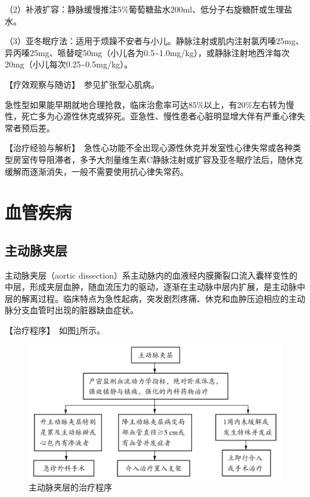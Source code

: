 （2）补液扩容：静脉缓慢推注5\%葡萄糖盐水200ml、低分子右旋糖酐或生理盐水。

（3）亚冬眠疗法：适用于烦躁不安者与小儿。静脉注射或肌内注射氯丙嗪25mg、异丙嗪25mg、哌替啶50mg（小儿各为0.5\textasciitilde{}1.0mg/kg），或静脉注射地西泮每次20mg（小儿每次0.25\textasciitilde{}0.5mg/kg）。

【疗效观察与随访】　参见扩张型心肌病。

急性型如果能早期就地合理抢救，临床治愈率可达85\%以上，有20\%左右转为慢性，死亡多为心源性休克或猝死。亚急性、慢性患者心脏明显增大伴有严重心律失常者预后差。

【治疗经验与解析】　急性心功能不全出现心源性休克并发室性心律失常或各种类型房室传导阻滞者，多予大剂量维生素C静脉注射或扩容及亚冬眠疗法后，随休克缓解而逐渐消失，一般不需要使用抗心律失常药。


\section{血管疾病}

\subsection{主动脉夹层}

主动脉夹层（aortic
dissection）系主动脉内的血液经内膜撕裂口流入囊样变性的中层，形成夹层血肿，随血流压力的驱动，逐渐在主动脉中层内扩展，是主动脉中层的解离过程。临床特点为急性起病，突发剧烈疼痛、休克和血肿压迫相应的主动脉分支血管时出现的脏器缺血症状。

【治疗程序】　如图\ref{fig2-14-1}所示。

\begin{figure}[!htbp]
 \centering
 \includegraphics{./images/Image00082.jpg}
 \captionsetup{justification=centering}
 \caption{主动脉夹层的治疗程序}
 \label{fig2-14-1}
  \end{figure} 

